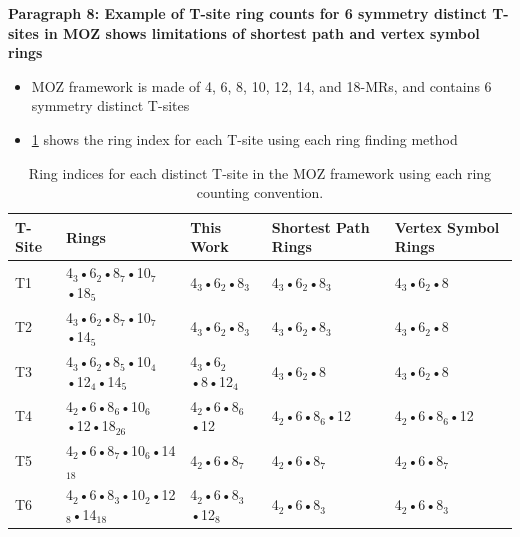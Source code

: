 \documentclass[11pt]{article}
\begin{document}
\textbf{\textbf{Paragraph 8: Example of T-site ring counts for 6 symmetry distinct T-sites in MOZ shows limitations of shortest path and vertex symbol rings}}
\begin{itemize}
\item MOZ framework is made of 4, 6, 8, 10, 12, 14, and 18-MRs, and contains 6 symmetry distinct T-sites
\item \cref{table:moz} shows the ring index for each T-site using each ring finding method
\end{itemize}
\begin{table}[htbp]
\caption{Ring indices for each distinct T-site in the MOZ framework using each ring counting convention. \label{table:moz}}
\centering
\begin{tabular}{lllll}
T-Site & Rings & This Work & Shortest Path Rings & Vertex Symbol Rings\\
\hline
T1 & 4\(_{\text{3}}\)•6\(_{\text{2}}\)•8\(_{\text{7}}\)•10\(_{\text{7}}\)•18\(_{\text{5}}\) & 4\(_{\text{3}}\)•6\(_{\text{2}}\)•8\(_{\text{3}}\) & 4\(_{\text{3}}\)•6\(_{\text{2}}\)•8\(_{\text{3}}\) & 4\(_{\text{3}}\)•6\(_{\text{2}}\)•8\\
T2 & 4\(_{\text{3}}\)•6\(_{\text{2}}\)•8\(_{\text{7}}\)•10\(_{\text{7}}\)•14\(_{\text{5}}\) & 4\(_{\text{3}}\)•6\(_{\text{2}}\)•8\(_{\text{3}}\) & 4\(_{\text{3}}\)•6\(_{\text{2}}\)•8\(_{\text{3}}\) & 4\(_{\text{3}}\)•6\(_{\text{2}}\)•8\\
T3 & 4\(_{\text{3}}\)•6\(_{\text{2}}\)•8\(_{\text{5}}\)•10\(_{\text{4}}\)•12\(_{\text{4}}\)•14\(_{\text{5}}\) & 4\(_{\text{3}}\)•6\(_{\text{2}}\)•8•12\(_{\text{4}}\) & 4\(_{\text{3}}\)•6\(_{\text{2}}\)•8 & 4\(_{\text{3}}\)•6\(_{\text{2}}\)•8\\
T4 & 4\(_{\text{2}}\)•6•8\(_{\text{6}}\)•10\(_{\text{6}}\)•12•18\(_{\text{26}}\) & 4\(_{\text{2}}\)•6•8\(_{\text{6}}\)•12 & 4\(_{\text{2}}\)•6•8\(_{\text{6}}\)•12 & 4\(_{\text{2}}\)•6•8\(_{\text{6}}\)•12\\
T5 & 4\(_{\text{2}}\)•6•8\(_{\text{7}}\)•10\(_{\text{6}}\)•14\(_{\text{18}}\) & 4\(_{\text{2}}\)•6•8\(_{\text{7}}\) & 4\(_{\text{2}}\)•6•8\(_{\text{7}}\) & 4\(_{\text{2}}\)•6•8\(_{\text{7}}\)\\
T6 & 4\(_{\text{2}}\)•6•8\(_{\text{3}}\)•10\(_{\text{2}}\)•12\(_{\text{8}}\)•14\(_{\text{18}}\) & 4\(_{\text{2}}\)•6•8\(_{\text{3}}\)•12\(_{\text{8}}\) & 4\(_{\text{2}}\)•6•8\(_{\text{3}}\) & 4\(_{\text{2}}\)•6•8\(_{\text{3}}\)\\
\end{tabular}
\end{table}
\end{document}
